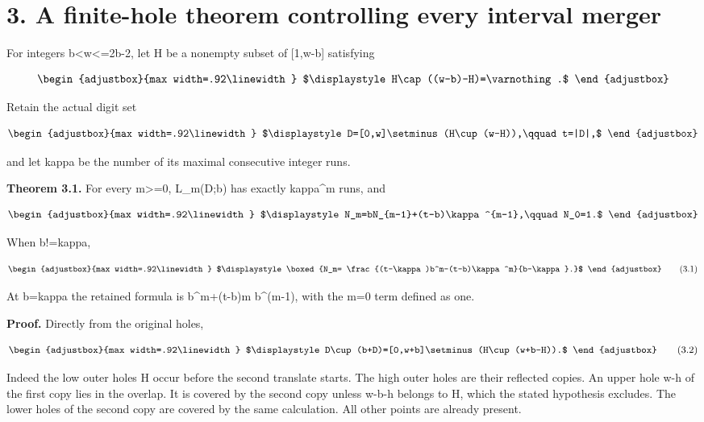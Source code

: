 \section{3. A finite-hole theorem controlling every interval merger}\label{n20-a-finite-hole-theorem-controlling-every-interval-merger}

For integers b\textless w\textless=2b-2, let H be a nonempty subset of {[}1,w-b{]} satisfying

\[
\begin{adjustbox}{max width=.92\linewidth}
$\displaystyle H\cap((w-b)-H)=\varnothing.$
\end{adjustbox}
\]

Retain the actual digit set

\[
\begin{adjustbox}{max width=.92\linewidth}
$\displaystyle D=[0,w]\setminus(H\cup(w-H)),\qquad t=|D|,$
\end{adjustbox}
\]

and let kappa be the number of its maximal consecutive integer runs.

\textbf{Theorem 3.1.} For every m\textgreater=0, L\_m(D;b) has exactly kappa\^{}m runs, and

\[
\begin{adjustbox}{max width=.92\linewidth}
$\displaystyle N_m=bN_{m-1}+(t-b)\kappa^{m-1},\qquad N_0=1.$
\end{adjustbox}
\]

When b!=kappa,

\[
\begin{adjustbox}{max width=.92\linewidth}
$\displaystyle \boxed{N_m=
 \frac{(t-\kappa)b^m-(t-b)\kappa^m}{b-\kappa}.}$
\end{adjustbox}
\tag{3.1}
\]

At b=kappa the retained formula is b\^{}m+(t-b)m b\^{}(m-1), with the m=0 term defined as one.

\textbf{Proof.} Directly from the original holes,

\[
\begin{adjustbox}{max width=.92\linewidth}
$\displaystyle D\cup(b+D)=[0,w+b]\setminus(H\cup(w+b-H)).$
\end{adjustbox}
\tag{3.2}
\]

Indeed the low outer holes H occur before the second translate starts. The high outer holes are their reflected copies. An upper hole w-h of the first copy lies in the overlap. It is covered by the second copy unless w-b-h belongs to H, which the stated hypothesis excludes. The lower holes of the second copy are covered by the same calculation. All other points are already present.

